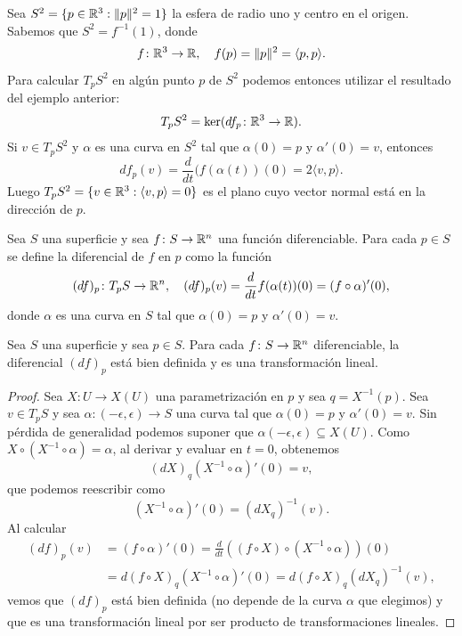 \begin{example}
	Sea $S^2=\{p\in\mathbb{R}^3:\|p\|^2=1\}$ la esfera de radio uno y centro en el
	origen. Sabemos que $S^2=f^{-1}(1)$, donde 
	\[
		f\colon\mathbb{R}^3\to\mathbb{R},\quad
		f(p)=\|p\|^2=\langle p,p\rangle.
	\]
	Para calcular $T_pS^2$ en algún punto $p$ de $S^2$ podemos entonces
	utilizar el resultado del ejemplo anterior:
	\[
		T_pS^2=\ker(df_p\colon\mathbb{R}^3\to\mathbb{R}).		
	\]
	Si $v\in T_pS^2$ y $\alpha$ es una curva en $S^2$ tal que $\alpha(0)=p$ y $\alpha'(0)=v$, entonces 
	\[
		df_p(v)=\frac{d}{dt}(f(\alpha(t))(0)=2\langle v,p\rangle.
	\]
	Luego $T_pS^2=\{v\in\mathbb{R}^3:\langle v,p\rangle=0\}$ es el plano cuyo vector
	normal está en la dirección de $p$.
\end{example}


\begin{definition}
	Sea $S$ una superficie y sea $f\colon S\to\mathbb{R}^n$ una función diferenciable.
	Para cada $p\in S$ se define la diferencial de $f$ en $p$ como la
	función
	\[
			(df)_p\colon T_pS\to\mathbb{R}^n,\quad
			(df)_p(v)=\frac{d}{dt}f(\alpha(t))(0)=(f\circ\alpha)'(0),
	\]
	donde $\alpha$ es una curva en $S$ tal que $\alpha(0)=p$ y $\alpha'(0)=v$.
\end{definition}

\begin{proposition}
	Sea $S$ una superficie y sea $p\in S$. Para cada $f\colon S\to\mathbb{R}^n$ 
	diferenciable, la diferencial $(df)_p$ está bien definida y es una
	transformación lineal. 
\end{proposition}

\begin{proof}
	Sea $X\colon U\to X(U)$ una parametrización en $p$ y sea $q=X^{-1}(p)$. Sea
	$v\in T_pS$ y sea $\alpha\colon(-\epsilon,\epsilon)\to S$ una curva tal que
	$\alpha(0)=p$ y $\alpha'(0)=v$. Sin pérdida de generalidad podemos suponer
	que $\alpha(-\epsilon,\epsilon)\subseteq X(U)$. Como $X\circ (X^{-1}\circ
	\alpha)=\alpha$, al derivar y evaluar en $t=0$, obtenemos
	\[
		(dX)_q(X^{-1}\circ\alpha)'(0)=v,
	\]
	que podemos reescribir como
	\[
		(X^{-1}\circ\alpha)'(0)=(dX_q)^{-1}(v).
	\]
	Al calcular 
	\begin{align*}
		(df)_p(v) &= (f\circ\alpha)'(0)
		=\frac{d}{dt}\left( (f\circ X)\circ (X^{-1}\circ\alpha)\right)(0)\\
		&=d(f\circ X)_q(X^{-1}\circ\alpha)'(0)
		=d(f\circ X)_q(dX_q)^{-1}(v),
	\end{align*}
	vemos que $(df)_p$ está bien definida (no depende de la curva $\alpha$ que
	elegimos) y que es una transformación lineal por ser producto de
	transformaciones lineales.
\end{proof}

